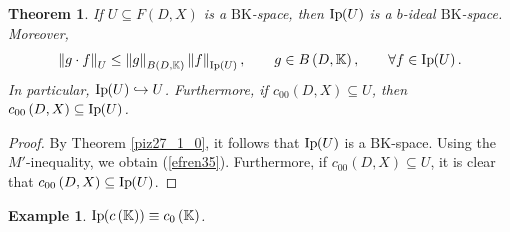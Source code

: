 \documentclass[14pt, a4paper]{article}  %
\providecommand{\pare}[1]{\left( #1\right) }
\providecommand{\norm}[1]{\left\lVert#1\right\rVert}
\newcommand{\K}{\mathbb{K}}
\newcommand{\BK}{\text{BK}}
\newtheorem{theorem}{Theorem}[section]
\newtheorem{example}{Example}[section]  %
\begin{document}
		\begin{theorem}\label{d334} \label{d335_0} \label{d310_0} 	If $U \subseteq F\pare{D,X}$ is a $\BK$-space, then  $\text{Ip}\hspace{-2pt}\pare{U}$ is a $b$-ideal $\BK$-space. Moreover, \begin{equation}\label{efren35} \norm{g\cdot f}_{U}\leq \norm{g}_{B\pare{D,\K}}\norm{f}_{\text{Ip}\hspace{-0pt}\pare{U}},\qquad g\in B\pare{D,\K}, \qquad \forall f\in \textnormal{Ip}\hspace{-2pt}\pare{U}. \end{equation} In particular, $\textnormal{Ip}\hspace{-2pt}\pare{U} \hookrightarrow U$. Furthermore, if $c_{00}\pare{D,X} \subseteq U$, then $c_{00}\pare{D,X} \subseteq \textnormal{Ip}\hspace{-2pt}\pare{U}$.  
	\end{theorem}
	\begin{proof}  
		By Theorem \ref{piz27_1_0}, it follows that $\text{Ip}\hspace{-2pt}\pare{U}$ is a $\BK$-space. Using the $M'$-inequality, we obtain (\ref{efren35}). Furthermore, if $c_{00}\pare{D,X} \subseteq U$, it is clear that $c_{00}\pare{D,X} \subseteq \text{Ip}\hspace{-2pt}\pare{U}$.
	\end{proof}
	
	\begin{example} $\textnormal{Ip}\hspace{-2pt}\pare{ c\pare{\K}}\equiv c_{0}\pare{\K}$. 
	\end{example}
 
	
	
	
	
	
	
	
	
	
	
	
	
	
	
\end{document}

